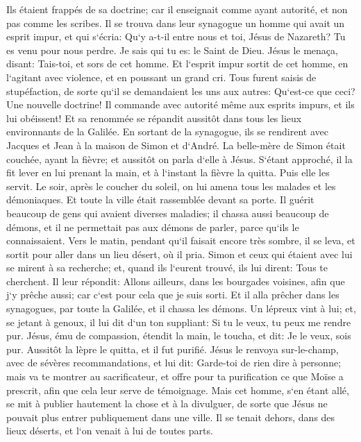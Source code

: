 \verse Ils étaient frappés de sa doctrine; car il enseignait comme ayant autorité, et non pas comme les scribes. 
\verse Il se trouva dans leur synagogue un homme qui avait un esprit impur, et qui s`écria: 
\verse Qu`y a-t-il entre nous et toi, Jésus de Nazareth? Tu es venu pour nous perdre. Je sais qui tu es: le Saint de Dieu. 
\verse Jésus le menaça, disant: Tais-toi, et sors de cet homme. 
\verse Et l`esprit impur sortit de cet homme, en l`agitant avec violence, et en poussant un grand cri. 
\verse Tous furent saisis de stupéfaction, de sorte qu`il se demandaient les uns aux autres: Qu`est-ce que ceci? Une nouvelle doctrine! Il commande avec autorité même aux esprits impurs, et ils lui obéissent! 
\verse Et sa renommée se répandit aussitôt dans tous les lieux environnants de la Galilée. 
\verse En sortant de la synagogue, ils se rendirent avec Jacques et Jean à la maison de Simon et d`André. 
\verse La belle-mère de Simon était couchée, ayant la fièvre; et aussitôt on parla d`elle à Jésus. 
\verse S`étant approché, il la fit lever en lui prenant la main, et à l`instant la fièvre la quitta. Puis elle les servit. 
\verse Le soir, après le coucher du soleil, on lui amena tous les malades et les démoniaques. 
\verse Et toute la ville était rassemblée devant sa porte. 
\verse Il guérit beaucoup de gens qui avaient diverses maladies; il chassa aussi beaucoup de démons, et il ne permettait pas aux démons de parler, parce qu`ils le connaissaient. 
\verse Vers le matin, pendant qu`il faisait encore très sombre, il se leva, et sortit pour aller dans un lieu désert, où il pria. 
\verse Simon et ceux qui étaient avec lui se mirent à sa recherche; 
\verse et, quand ils l`eurent trouvé, ils lui dirent: Tous te cherchent. 
\verse Il leur répondit: Allons ailleurs, dans les bourgades voisines, afin que j`y prêche aussi; car c`est pour cela que je suis sorti. 
\verse Et il alla prêcher dans les synagogues, par toute la Galilée, et il chassa les démons. 
\verse Un lépreux vint à lui; et, se jetant à genoux, il lui dit d`un ton suppliant: Si tu le veux, tu peux me rendre pur. 
\verse Jésus, ému de compassion, étendit la main, le toucha, et dit: Je le veux, sois pur. 
\verse Aussitôt la lèpre le quitta, et il fut purifié. 
\verse Jésus le renvoya sur-le-champ, avec de sévères recommandations, 
\verse et lui dit: Garde-toi de rien dire à personne; mais va te montrer au sacrificateur, et offre pour ta purification ce que Moïse a prescrit, afin que cela leur serve de témoignage. 
\verse Mais cet homme, s`en étant allé, se mit à publier hautement la chose et à la divulguer, de sorte que Jésus ne pouvait plus entrer publiquement dans une ville. Il se tenait dehors, dans des lieux déserts, et l`on venait à lui de toutes parts. 

